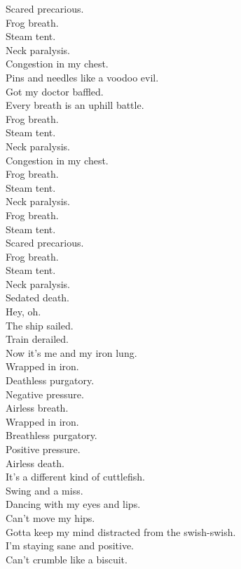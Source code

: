 Scared precarious. \\
Frog breath. \\
Steam tent. \\
Neck paralysis. \\
Congestion in my chest. \\
Pins and needles like a voodoo evil. \\
Got my doctor baffled. \\
Every breath is an uphill battle. \\
Frog breath. \\
Steam tent. \\
Neck paralysis. \\
Congestion in my chest. \\

Frog breath. \\
Steam tent. \\
Neck paralysis. \\
Frog breath. \\
Steam tent. \\
Scared precarious. \\
Frog breath. \\
Steam tent. \\
Neck paralysis. \\
Sedated death. \\

Hey, oh. \\
The ship sailed. \\
Train derailed. \\
Now it's me and my iron lung. \\
Wrapped in iron. \\
Deathless purgatory. \\
Negative pressure. \\
Airless breath. \\
Wrapped in iron. \\
Breathless purgatory. \\
Positive pressure. \\
Airless death. \\

It's a different kind of cuttlefish. \\
Swing and a miss. \\
Dancing with my eyes and lips. \\
Can't move my hips. \\
Gotta keep my mind distracted from the swish-swish. \\
I'm staying sane and positive. \\
Can't crumble like a biscuit. \\

